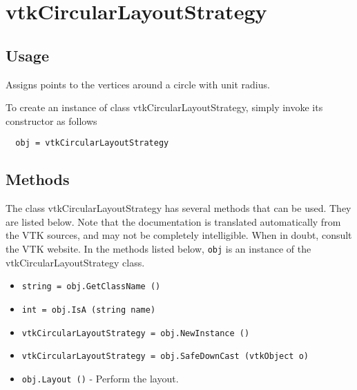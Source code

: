 \section{vtkCircularLayoutStrategy}

\subsection{Usage}

 Assigns points to the vertices around a circle with unit radius.

To create an instance of class vtkCircularLayoutStrategy, simply
invoke its constructor as follows
\begin{verbatim}
  obj = vtkCircularLayoutStrategy
\end{verbatim}
\subsection{Methods}

The class vtkCircularLayoutStrategy has several methods that can be used.
  They are listed below.
Note that the documentation is translated automatically from the VTK sources,
and may not be completely intelligible.  When in doubt, consult the VTK website.
In the methods listed below, \verb|obj| is an instance of the vtkCircularLayoutStrategy class.
\begin{itemize}
\item  \verb|string = obj.GetClassName ()|

\item  \verb|int = obj.IsA (string name)|

\item  \verb|vtkCircularLayoutStrategy = obj.NewInstance ()|

\item  \verb|vtkCircularLayoutStrategy = obj.SafeDownCast (vtkObject o)|

\item  \verb|obj.Layout ()| -  Perform the layout.

\end{itemize}
